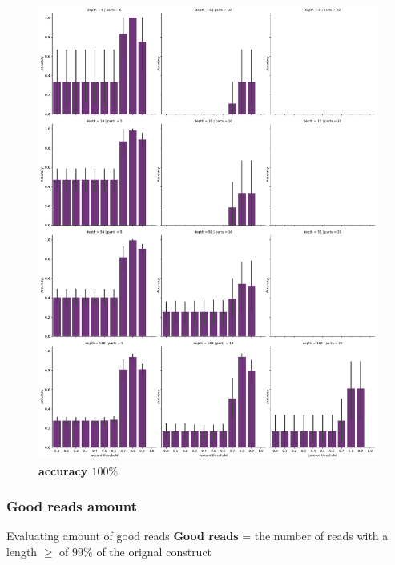 \documentclass[11pt, a4paper]{article}
\begin{document}
\begin{figure}[ht]
    \begin{center}
    \includegraphics[width=1\textwidth]{../results/images_notebook/v_322/100_good_reads_true_positves.pdf}
    \end{center}
    \caption{{\bf accuracy $100\%$}}
   \label{fig:v_322_accuracy_100}
\end{figure}

\subsubsection{Good reads amount}
Evaluating amount of good reads
\textbf{Good reads} = the number of reads with a length $\geq$ of $99\%$ of the orignal construct
\end{document}
